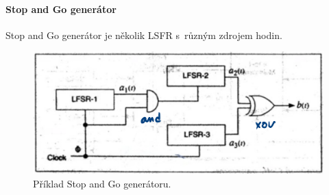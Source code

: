 \paragraph*{Stop and Go generátor} Stop and Go generátor je několik LSFR s~různým zdrojem hodin.

\begin{figure}[H]
    \centering
    \includegraphics[width=0.8\linewidth]{stop_and_go.png}
    \caption{Příklad Stop and Go generátoru.}
\end{figure}
